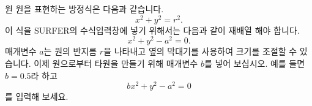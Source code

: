 \begin{surferPage}{원}
원을 표현하는 방정식은 다음과 같습니다.
\[x^2+y^2=r^2.\]
이 식을 SURFER의 수식입력창에 넣기 위해서는 다음과 같이 재배열 해야 합니다.
\[x^2+y^2-a^2=0.\]
매개변수 $a$는 원의 반지름 $r$을 나타내고 옆의 막대기를 사용하여 크기를 조절할 수 있습니다. 이제 원으로부터 타원을 만들기 위해 매개변수 $b$를 넣어 보십시오. 예를 들면 $b=0.5$라 하고 \[bx^2+y^2-a^2=0\] 를 입력해 보세요.
\end{surferPage}
